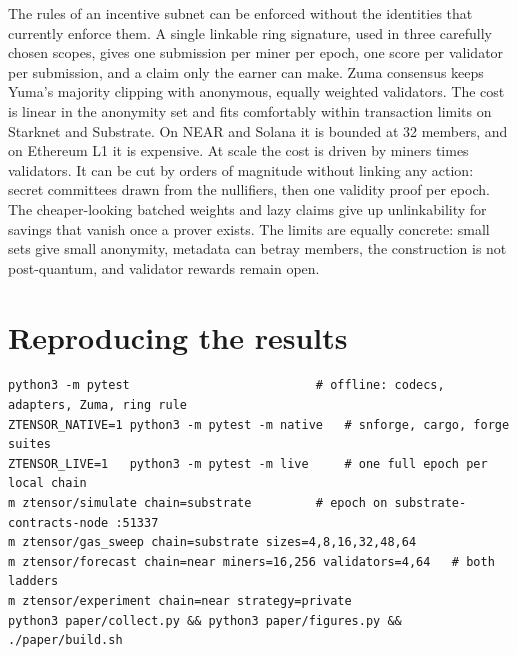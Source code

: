 \documentclass[11pt]{article}
\theoremstyle{remark}
\begin{document}
The rules of an incentive subnet can be enforced without the identities that currently enforce them. A single linkable ring signature, used in three carefully chosen scopes, gives one submission per miner per epoch, one score per validator per submission, and a claim only the earner can make. Zuma consensus keeps Yuma's majority clipping with anonymous, equally weighted validators. The cost is linear in the anonymity set and fits comfortably within transaction limits on Starknet and Substrate. On NEAR and Solana it is bounded at 32 members, and on Ethereum L1 it is expensive. At scale the cost is driven by miners times validators. It can be cut by orders of magnitude without linking any action: secret committees drawn from the nullifiers, then one validity proof per epoch. The cheaper-looking batched weights and lazy claims give up unlinkability for savings that vanish once a prover exists. The limits are equally concrete: small sets give small anonymity, metadata can betray members, the construction is not post-quantum, and validator rewards remain open.

\appendix
\section{Reproducing the results}\label{app:repro}
\begin{small}
\begin{verbatim}
python3 -m pytest                          # offline: codecs, adapters, Zuma, ring rule
ZTENSOR_NATIVE=1 python3 -m pytest -m native   # snforge, cargo, forge suites
ZTENSOR_LIVE=1   python3 -m pytest -m live     # one full epoch per local chain
m ztensor/simulate chain=substrate         # epoch on substrate-contracts-node :51337
m ztensor/gas_sweep chain=substrate sizes=4,8,16,32,48,64
m ztensor/forecast chain=near miners=16,256 validators=4,64   # both ladders
m ztensor/experiment chain=near strategy=private
python3 paper/collect.py && python3 paper/figures.py && ./paper/build.sh
\end{verbatim}
\end{small}



\end{document}
